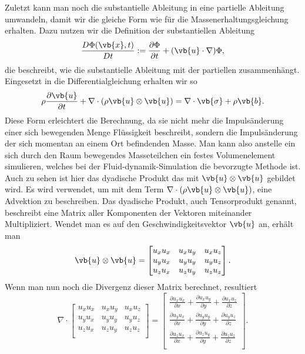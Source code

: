 Zuletzt kann man noch die substantielle Ableitung in eine partielle Ableitung umwandeln, damit wir die gleiche Form wie für die Massenerhaltungsgleichung erhalten.
Dazu nutzen wir die Definition der substantiellen Ableitung
\[
\frac{D\Phi(\vb{x},t)}{Dt}
:=
\frac{\partial \Phi}{\partial t}+(\vb{u}\cdot \nabla)\Phi
,\] 
die beschreibt, wie die substantielle Ableitung mit der partiellen zusammenhängt.
Eingesetzt in die Differentialgleichung erhalten wir so 
\begin{equation}
\label{openfoam:euler2}
\rho\frac{\partial\vb{u}}{\partial t} + \nabla \cdot(\rho\vb{u}\otimes \vb{u})
= 
\nabla \cdot \vb{\sigma} +\rho \vb{b}.
\end{equation}
Diese Form erleichtert die Berechnung, da sie nicht mehr die Impulsänderung einer sich bewegenden Menge Flüssigkeit beschreibt, sondern die Impulsänderung der sich momentan an einem Ort befindenden Masse. 
Man kann also anstelle ein sich durch den Raum bewegendes Masseteilchen ein festes Volumenelement simulieren, welches bei der Fluid-dynamik-Simulation die bevorzugte Methode ist.
Auch zu sehen ist hier das dyadische Produkt das mit $\vb{u}\otimes \vb{u}$ gebildet wird.
Es wird verwendet, um mit dem Term $\nabla \cdot(\rho\vb{u}\otimes \vb{u})$, eine Advektion zu beschreiben.
Das dyadische Produkt, auch Tensorprodukt genannt, beschreibt eine Matrix aller Komponenten der Vektoren miteinander Multipliziert.
Wendet man es auf den Geschwindigkeitsvektor $\vb{u}$ an, erhält man
\begin{equation}
\vb{u}\otimes \vb{u}
= 
\begin{bmatrix}
	u_x u_x &  u_x u_y & u_x u_z \\
	u_y u_x &  u_y u_y & u_y u_z \\
	u_z u_x &  u_z u_y & u_z u_z \\
\end{bmatrix}
.
\end{equation}
Wenn man nun noch die Divergenz dieser Matrix berechnet, resultiert
\begin{equation}
\nabla \cdot 
\begin{bmatrix}
	u_x u_x &  u_x u_y & u_x u_z \\
	u_y u_x &  u_y u_y & u_y u_z \\
	u_z u_x &  u_z u_y & u_z u_z \\
\end{bmatrix}
= 
\begin{bmatrix}
	\frac{\partial u_x u_x}{\partial x} +  \frac{\partial u_x u_y}{\partial y} + \frac{\partial u_x u_z}{\partial z} \\
	\frac{\partial u_y u_x}{\partial x} +  \frac{\partial u_y u_y}{\partial y} + \frac{\partial u_y u_z}{\partial z} \\
	\frac{\partial u_z u_x}{\partial x} +  \frac{\partial u_z u_y}{\partial y} + \frac{\partial u_z u_z}{\partial z}  \\
\end{bmatrix}
.
\end{equation}
